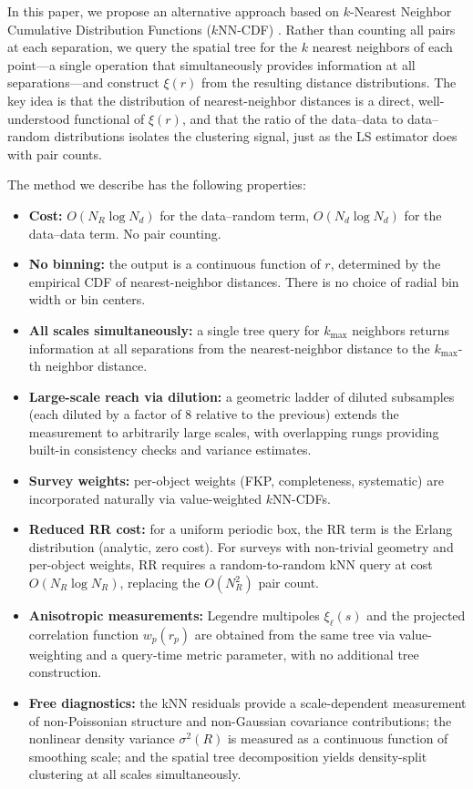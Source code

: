 In this paper, we propose an alternative approach based on $k$-Nearest Neighbor Cumulative Distribution Functions ($k$NN-CDF) \citep{Banerjee2020}.  Rather than counting all pairs at each separation, we query the spatial tree for the $k$ nearest neighbors of each point---a single operation that simultaneously provides information at all separations---and construct $\xi(r)$ from the resulting distance distributions.  The key idea is that the distribution of nearest-neighbor distances is a direct, well-understood functional of $\xi(r)$, and that the ratio of the data--data to data--random distributions isolates the clustering signal, just as the LS estimator does with pair counts.

The method we describe has the following properties:
\begin{itemize}[nosep]
  \item \textbf{Cost:} $O(N_R \log N_d)$ for the data--random term, $O(N_d \log N_d)$ for the data--data term.  No pair counting.
  \item \textbf{No binning:} the output is a continuous function of $r$, determined by the empirical CDF of nearest-neighbor distances.  There is no choice of radial bin width or bin centers.
  \item \textbf{All scales simultaneously:} a single tree query for $k_{\max}$ neighbors returns information at all separations from the nearest-neighbor distance to the $k_{\max}$-th neighbor distance.
  \item \textbf{Large-scale reach via dilution:}  a geometric ladder of diluted subsamples (each diluted by a factor of 8 relative to the previous) extends the measurement to arbitrarily large scales, with overlapping rungs providing built-in consistency checks and variance estimates.
  \item \textbf{Survey weights:} per-object weights (FKP, completeness, systematic) are incorporated naturally via value-weighted $k$NN-CDFs.
  \item \textbf{Reduced RR cost:} for a uniform periodic box, the RR term is the Erlang distribution (analytic, zero cost).  For surveys with non-trivial geometry and per-object weights, RR requires a random-to-random kNN query at cost $O(N_R \log N_R)$, replacing the $O(N_R^2)$ pair count.
  \item \textbf{Anisotropic measurements:} Legendre multipoles $\xi_\ell(s)$ and the projected correlation function $w_p(r_p)$ are obtained from the same tree via value-weighting and a query-time metric parameter, with no additional tree construction.
  \item \textbf{Free diagnostics:} the kNN residuals provide a scale-dependent measurement of non-Poissonian structure and non-Gaussian covariance contributions; the nonlinear density variance $\sigma^2(R)$ is measured as a continuous function of smoothing scale; and the spatial tree decomposition yields density-split clustering at all scales simultaneously.
\end{itemize}

